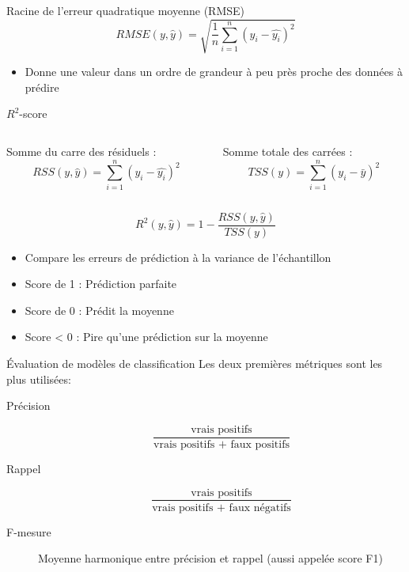 \begin{frame}{Racine de l'erreur quadratique moyenne (RMSE)}
  \begin{equation*}
    RMSE(y,\hat{y})=\sqrt{\frac{1}{n}\sum^n_{i=1}(y_i-\hat{y_i})^2}
  \end{equation*}

  \begin{itemize}
    \item Donne une valeur dans un ordre de grandeur à peu près proche des données à prédire
  \end{itemize}
\end{frame}

\begin{frame}{$R^2$-score}
  \begin{columns}
    \begin{column}{0.5\linewidth}
      Somme du carre des résiduels :
      \begin{equation*}
        RSS(y,\hat{y})=\sum^n_{i=1}(y_i-\hat{y_i})^2
      \end{equation*}
    \end{column}
    \begin{column}{0.5\linewidth}
      Somme totale des carrées :
      \begin{equation*}
        TSS(y)=\sum^n_{i=1}(y_i-\bar{y})^2
      \end{equation*}
    \end{column}
  \end{columns}
  \vfill
  \begin{equation*}
    R^2(y,\hat{y})=1-\frac{RSS(y,\hat{y})}{TSS(y)}
  \end{equation*}

  \begin{itemize}
    \item Compare les erreurs de prédiction à la variance de l'échantillon
    \item Score de 1 : Prédiction parfaite
    \item Score de 0 : Prédit la moyenne 
    \item Score < 0 : Pire qu'une prédiction sur la moyenne
  \end{itemize}
  \vfill
\end{frame}

\begin{frame}{Évaluation de modèles de classification}
  Les deux premières métriques sont les plus utilisées:
  \begin{description}
  \item[Précision]
    \[
    \frac{\text{vrais positifs}}{\text{vrais positifs + faux positifs}}
    \]
  \item[Rappel]
    \[
    \frac{\text{vrais positifs}}{\text{vrais positifs + faux négatifs}}
  \]
  \item[F-mesure] Moyenne harmonique entre précision et rappel (aussi appelée score F1)
  \end{description}
\end{frame}

